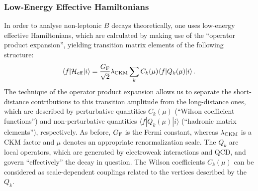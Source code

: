 \documentclass[11pt]{cernrep}
\begin{document}
\subsubsection{Low-Energy Effective Hamiltonians}\label{subsec:ham}
%
%
%
In order to analyse non-leptonic $B$ decays theoretically, one uses 
low-energy effective Hamiltonians, which are calculated by making use 
of the ``operator product expansion'', yielding transition 
matrix elements of the following structure:
\begin{equation}\label{ee2}
\langle f|{\cal H}_{\rm eff}|i\rangle=\frac{G_{\rm F}}{\sqrt{2}}
\lambda_{\rm CKM}\sum_k C_k(\mu)\langle f|Q_k(\mu)|i\rangle\,.
\end{equation}
The technique of the operator product expansion allows us to separate 
the short-distance contributions to this transition amplitude from the 
long-distance ones, which are described by perturbative quantities 
$C_k(\mu)$ (``Wilson coefficient functions'') and non-perturbative 
quantities $\langle f|Q_k(\mu)|i\rangle$ (``hadronic matrix elements''), 
respectively. As before, $G_{\rm F}$ is the Fermi constant, whereas
$\lambda_{\rm CKM}$ is a CKM factor and $\mu$ denotes an appropriate 
renormalization scale. The $Q_k$ are local operators, which 
are generated by electroweak interactions and QCD, and govern ``effectively'' 
the decay in question. The Wilson coefficients $C_k(\mu)$ can be 
considered as scale-dependent couplings related to the vertices described
by the $Q_k$.
\end{document}
